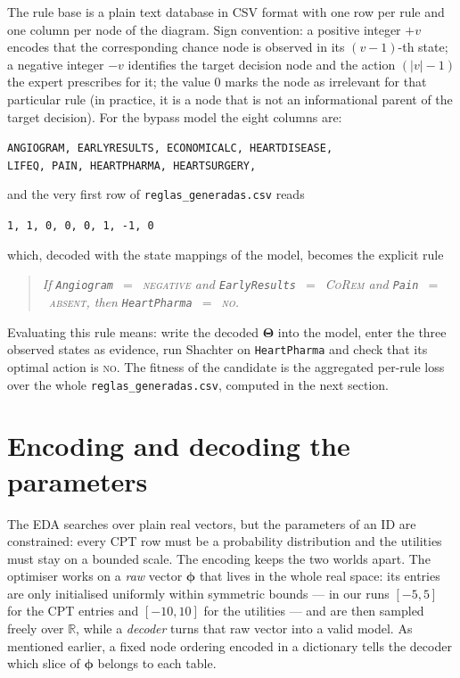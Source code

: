 The rule base is a plain text database in CSV format with one row per rule and one column per
node of the diagram. Sign convention: a positive integer
$+v$ encodes that the corresponding chance node is observed in its
$(v{-}1)$-th state; a negative integer $-v$ identifies the target
decision node and the action $(\lvert v\rvert{-}1)$ the expert prescribes
for it; the value $0$ marks the node as irrelevant for that
particular rule (in practice, it is a node that is not an
informational parent of the target decision). For the bypass model
the eight columns are:
\begin{center}
\texttt{ANGIOGRAM, EARLYRESULTS, ECONOMICALC, HEARTDISEASE,\\
LIFEQ, PAIN, HEARTPHARMA, HEARTSURGERY,}
\end{center}
and the very first row of \texttt{reglas\_generadas.csv} reads
\begin{center}
\texttt{1, 1, 0, 0, 0, 1, -1, 0}
\end{center}
which, decoded with the state mappings of the model, becomes the
explicit rule
\begin{quote}
\emph{If \texttt{Angiogram}~$=$~\textsc{negative} \;and\;
\texttt{EarlyResults}~$=$~\textsc{CoRem} \;and\;
\texttt{Pain}~$=$~\textsc{absent},
\quad then \;\texttt{HeartPharma}~$=$~\textsc{no}.}
\end{quote}
Evaluating this rule means: write the decoded $\boldsymbol{\Theta}$
into the model, enter the three observed states as evidence, run
Shachter on \texttt{HeartPharma} and check that its optimal action is
\textsc{no}. The fitness of the candidate is the aggregated per-rule
loss over the whole \texttt{reglas\_generadas.csv}, computed in the
next section.

\section{Encoding and decoding the parameters}
\label{sec:encoding}

The EDA searches over plain real vectors, but the parameters of an ID
are constrained: every CPT row must be a probability distribution and
the utilities must stay on a bounded scale. The encoding keeps the two
worlds apart. The optimiser works on a \emph{raw} vector
$\boldsymbol{\phi}$ that lives in the whole real space: its entries are only
initialised uniformly within symmetric bounds — in our runs $[-5,5]$ for the CPT
entries and $[-10,10]$ for the utilities — and are then sampled freely over
$\mathbb{R}$, while a \emph{decoder} turns that raw vector into a valid
model. As mentioned earlier, a fixed node ordering encoded in a dictionary tells the decoder which slice of
$\boldsymbol{\phi}$ belongs to each table.

